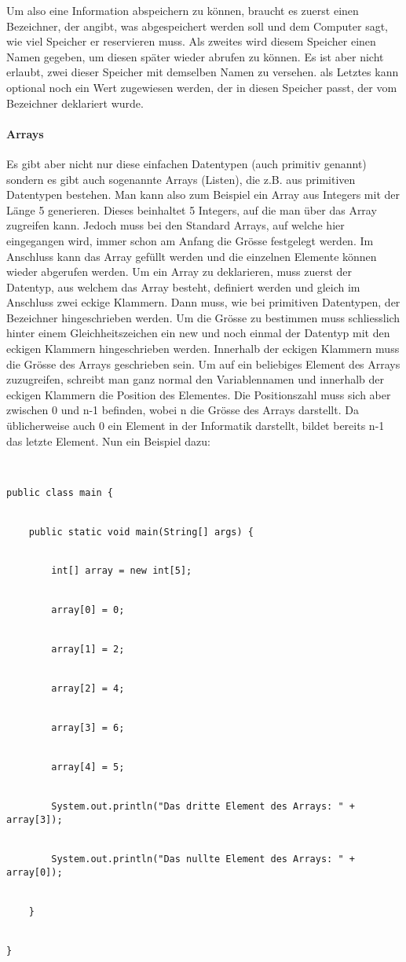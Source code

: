 Um also eine Information abspeichern zu können, braucht es zuerst einen Bezeichner, der angibt, was abgespeichert werden soll und dem Computer sagt, wie viel Speicher er reservieren muss. Als zweites wird diesem Speicher einen Namen gegeben, um diesen später wieder abrufen zu können. Es ist aber nicht erlaubt, zwei dieser Speicher mit demselben Namen zu versehen. als Letztes kann optional noch ein Wert zugewiesen werden, der in diesen Speicher passt, der vom Bezeichner deklariert wurde.


\paragraph{Arrays}


Es gibt aber nicht nur diese einfachen Datentypen (auch primitiv genannt) sondern es gibt auch sogenannte Arrays (Listen), die z.B. aus primitiven Datentypen bestehen. Man kann also zum Beispiel ein Array aus Integers mit der Länge 5 generieren. Dieses beinhaltet 5 Integers, auf die man über das Array zugreifen kann. Jedoch muss bei den Standard Arrays, auf welche hier eingegangen wird, immer schon am Anfang die Grösse festgelegt werden. Im Anschluss kann das Array gefüllt werden und die einzelnen Elemente können wieder abgerufen werden. Um ein Array zu deklarieren, muss zuerst der Datentyp, aus welchem das Array besteht, definiert werden und gleich im Anschluss zwei eckige Klammern. Dann muss, wie bei primitiven Datentypen, der Bezeichner hingeschrieben werden. Um die Grösse zu bestimmen muss schliesslich hinter einem Gleichheitszeichen ein new und noch einmal der Datentyp mit den eckigen Klammern hingeschrieben werden. Innerhalb der eckigen Klammern muss die Grösse des Arrays geschrieben sein. Um auf ein beliebiges Element des Arrays zuzugreifen, schreibt man ganz normal den Variablennamen und innerhalb der eckigen Klammern die Position des Elementes. Die Positionszahl muss sich aber zwischen 0 und n-1 befinden, wobei n die Grösse des Arrays darstellt. Da üblicherweise auch 0 ein Element in der Informatik darstellt, bildet bereits n-1 das letzte Element. Nun ein Beispiel dazu:


\begin{lstlisting}


public class main {


	public static void main(String[] args) {


		int[] array = new int[5];


		array[0] = 0;


		array[1] = 2;


		array[2] = 4;


		array[3] = 6;


		array[4] = 5;


		System.out.println("Das dritte Element des Arrays: " + array[3]);


		System.out.println("Das nullte Element des Arrays: " + array[0]);


	}


}


\end{lstlisting}


